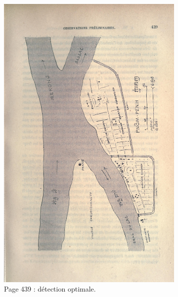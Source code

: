 \begin{figure}
    \centering
    \begin{subfigure}{0.4\textwidth}
     \includegraphics[width=1\linewidth]{img/odm90_439.jpg}
     \caption{Page 439 : détection optimale.}
     \label{fig:odmfig90439}
    \end{subfigure}
    \hspace{5pt}
    \begin{subfigure}{0.4\textwidth}

\end{subfigure}
\end{figure}
